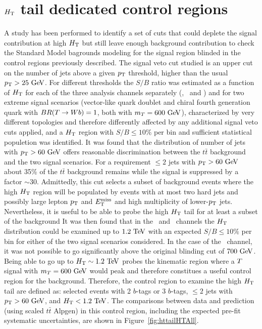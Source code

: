 
\clearpage

\section{$\HT$ tail dedicated control regions}\label{app:htx_httail}

A study has been performed to identify a set of cuts that could deplete the signal
contribution at high $\HT$ but still leave enough background contribution 
to check the Standard Model bagrounds modeling for the signal region blinded
in the control regions previously described. 
The signal veto cut studied is an upper cut on the number 
of jets above a given $\pt$ threshold, higher than the usual $\pt>25\gev$. 
For different thresholds
the $S/B$ ratio was estimated as a function of $\HT$ for 
each of the three analysis channels separately (\chii, \chiii\ and \chiv) 
and for two extreme signal scenarios (vector-like quark doublet and chiral 
fourth generation quark with $BR(\T \to Wb)=1$, both with $m_{\T}=600\gev$),
characterized by very different topologies and therefore differently affected by any additional
signal veto cuts applied, and a $\HT$ region with $S/B\leq 10\%$ per bin
and sufficient statistical populetion was identified.
It was found that the distribution of number of 
jets with $\pt>60\gev$ offers reasonable discrimination 
between the $t\bar{t}$ background and the two 
signal scenarios.%
For a requirement $\leq 2$ jets with $\pt>60\gev$ 
about 35\% of the $t\bar{t}$ background remains while the signal is suppressed
by a factor $\sim 30$. 
Admittedly, this cut selects a subset of background events where the high $\HT$ region will be populated
by events with at most two hard jets and possibly large lepton $\pt$ and $\met$ and high multiplicity of lower-$\pt$ jets. 
Nevertheless, it is useful to be able to probe the high $\HT$ tail for at least a subset of the background
It was then found that in the \chii\ and \chiii\ channels the $\HT$ distribution 
could be examined  up to $1.2\tev$ with an expected $S/B\leq 10\%$ per bin for 
either of the two signal scenarios considered. In the case of the \chiv\ channel, 
it was not possible to go significantly
above the original blinding cut of $700\gev$. 
Being able to go up to $\HT\sim 1.2\tev$ probes the kinematic region where a $\T$
signal with $m_{\T}=600\gev$ would peak and therefore constitues a useful control region for the background.
Therefore, the control region to examine the high $\HT$ tail are defined as: selected events with 2 $b$-tags or  3 $b$-tags, 
$\leq 2$ jets with $\pt>60\gev$, and $\HT<1.2\tev$.  
The comparisons between data and prediction (using scaled $t\bar{t}$ {\sc Alpgen}) 
in this control region, including the expected pre-fit systematic uncertainties, are shown
in Figure~\ref{fig:httailHTAll}.


